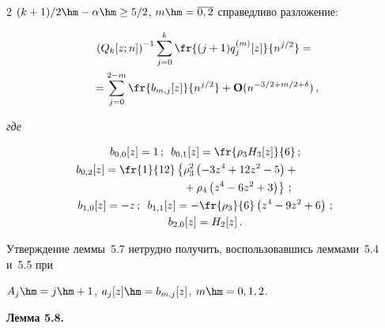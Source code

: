 \begin{multicols}{2}
{ $(k+1)/2\hm-\alpha\hm\geq 5/2$, $m\hm=\overline{0,2}$ справедливо разложение}:


 \begin{multline*}


  \left(Q_k[z;n]\right)^{-1}\sum\limits_{j=0}^k \fr{(j+1)q_j^{(m)}[z]}{n^{j/2}} ={}\\


  {}=


  \sum\limits_{j=0}^{2-m} \fr{b_{m,j}[z]}{n^{j/2}}+


  \Op(n^{-3/2+m/2+\delta})\,,




 \end{multline*}


\textit{где}


 \begin{gather*}


 b_{0,0}[z]=1\,;\enskip  b_{0,1}[z]=\fr{\rho_3 H_3[z]}{6}\,;


\\


 \hspace*{-11mm}b_{0,2}[z]=   \fr{1}{12} \left\{\rho_3^2\left(-3z^4+12z^2-5\right)+{}\right.\\


 \left.\hspace*{20mm}{}+


  \rho_4\left(z^4-6z^2+3\right)\right\}\,;


\\


 b_{1,0}[z]=-z\,;\enskip


 b_{1,1}[z]=-\fr{\rho_3}{6}\left(z^4-9z^2+6\right)\,;\\


 b_{2,0}[z]=H_2[z]\,.


 \end{gather*}





 Утверждение леммы~5.7 нетрудно получить, воспользовавшись леммами~5.4 и~5.5 при


 $A_j\hm=j\hm+1$, $a_j[z]\hm=b_{m,j}[z]$,  $m\hm=0,1,2$.





 \smallskip





\noindent


\textbf{Лемма 5.8.}\



\end{multicols}
